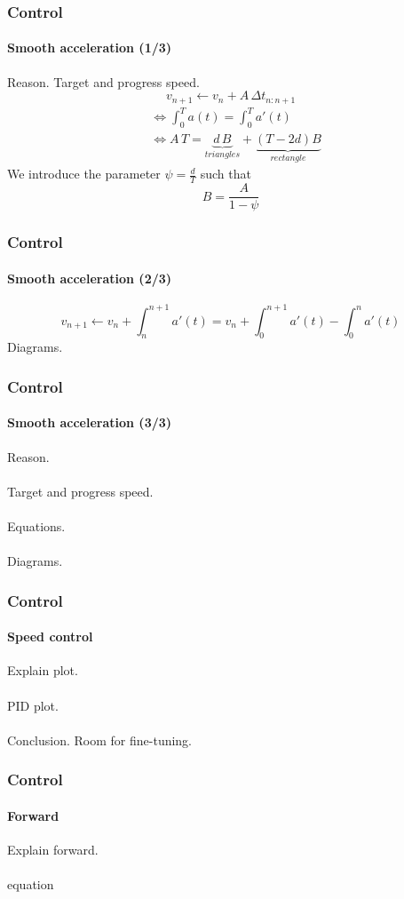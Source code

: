 \documentclass{beamer}
\begin{document}

\begin{frame}
\frametitle{Control}
\framesubtitle{Smooth acceleration (1/3)}
Reason. Target and progress speed.
$$
v_{n+1} \leftarrow v_n + A \, \Delta t_{n:n+1}
$$
\begin{align*}
&\Leftrightarrow \int_{0}^{T}a(t) =  \int_{0}^{T}a'(t) \\
&\Leftrightarrow A\,T = \underbrace{d\,B}_{triangles} + \underbrace{(T - 2d)B}_{rectangle}
\end{align*}
We introduce the parameter $\psi = \frac{d}{T}$ such that
$$
B = \frac{A}{1-\psi} 
$$
\end{frame}


\begin{frame}
\frametitle{Control}
\framesubtitle{Smooth acceleration (2/3)}
$$
v_{n+1} \leftarrow v_n + \int_{n}^{n+1}a'(t) = v_n + \int_{0}^{n+1}a'(t) - \int_{0}^{n}a'(t)
$$
Diagrams.
\end{frame}


\begin{frame}
\frametitle{Control}
\framesubtitle{Smooth acceleration (3/3)}
Reason.\\~\\
Target and progress speed.\\~\\
Equations.\\~\\
Diagrams.
\end{frame}


\begin{frame}
\frametitle{Control}
\framesubtitle{Speed control}
Explain plot.\\~\\
PID plot.\\~\\
Conclusion. Room for fine-tuning.
\end{frame}


\begin{frame}
\frametitle{Control}
\framesubtitle{Forward}
Explain forward.\\~\\
equation
\end{frame}
\end{document}
